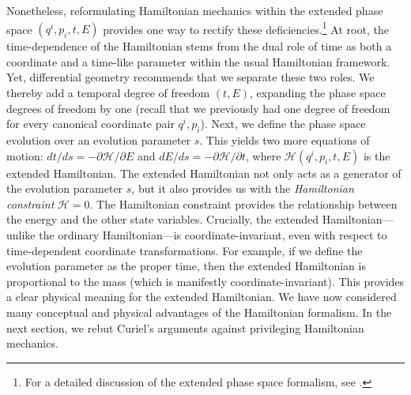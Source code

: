 \documentclass[letterpaper]{article}
\begin{document}
Nonetheless, reformulating Hamiltonian mechanics within the extended phase space $(q^i, p_i, t, E)$ provides one way to rectify these deficiencies.\footnote{For a detailed discussion of the extended phase space formalism, see \textcites[]{Struckmeier}.} At root, the time-dependence of the Hamiltonian stems from the dual role of time as both a coordinate and a time-like parameter within the usual Hamiltonian framework. Yet, differential geometry recommends that we separate these two roles. We thereby add a temporal degree of freedom $(t, E) $, expanding the phase space degrees of freedom by one (recall that we previously had one degree of freedom for every canonical coordinate pair $q^i, p_i$). Next, we define the phase space evolution over an evolution parameter $s $. This yields two more equations of motion: $dt/ds = -\partial \mathcal{H}/ \partial E$ and $dE/ds = -\partial \mathcal{H}/ \partial t$, where $\mathcal{H}(q^i, p_i, t, E)$ is the extended Hamiltonian. The extended Hamiltonian not only acts as a generator of the evolution parameter $s$, but it also provides us with the \textit{Hamiltonian constraint} $\mathcal{H}=0$. The Hamiltonian constraint provides the relationship between the energy and the other state variables. Crucially, the extended Hamiltonian---unlike the ordinary Hamiltonian---is coordinate-invariant, even with respect to time-dependent coordinate transformations. For example, if we define the evolution parameter as the proper time, then the extended Hamiltonian is proportional to the mass (which is manifestly coordinate-invariant). This provides a clear physical meaning for the extended Hamiltonian. We have now considered many conceptual and physical advantages of the Hamiltonian formalism. In the next section, we rebut Curiel's \parencites*[]{Curiel} arguments against privileging Hamiltonian mechanics. 


\end{document}
